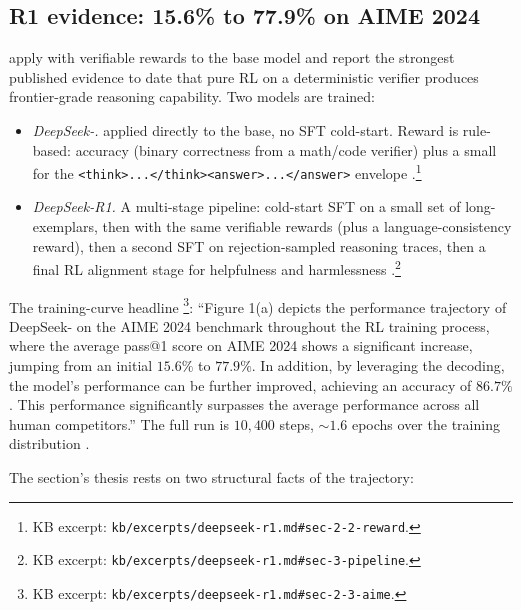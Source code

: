 \subsection{R1 evidence: 15.6\% to 77.9\% on AIME 2024}
\label{sec:rlvr-r1}

\citet{deepseek-r1} apply  with verifiable rewards to the
 base model and report the strongest published evidence to
date that pure RL on a deterministic verifier produces frontier-grade
reasoning capability. Two models are trained:

\begin{itemize}
\item \emph{DeepSeek-.}  applied directly to the base, no SFT
cold-start. Reward is rule-based: accuracy (binary correctness from a
math/code verifier) plus a small  for the
\texttt{<think>...</think><answer>...</answer>} envelope
\citep[\S 2.2]{deepseek-r1}.\footnote{KB excerpt:
\nolinkurl{kb/excerpts/deepseek-r1.md#sec-2-2-reward}.}
\item \emph{DeepSeek-R1.} A multi-stage pipeline: cold-start SFT on a
small set of long- exemplars, then  with the same verifiable
rewards (plus a language-consistency reward), then a second SFT on
rejection-sampled reasoning traces, then a final RL alignment stage for
helpfulness and harmlessness \citep[\S 3]{deepseek-r1}.\footnote{KB
excerpt: \nolinkurl{kb/excerpts/deepseek-r1.md#sec-3-pipeline}.}
\end{itemize}

The training-curve headline \citep[\S 2.3]{deepseek-r1}\footnote{KB
excerpt: \nolinkurl{kb/excerpts/deepseek-r1.md#sec-2-3-aime}.}: ``Figure
1(a) depicts the performance trajectory of DeepSeek- on the AIME
2024 benchmark throughout the RL training process, where the average
pass@1 score on AIME 2024 shows a significant increase, jumping from an
initial $15.6\%$ to $77.9\%$. In addition, by leveraging the
 decoding, the model's performance can be further
improved, achieving an accuracy of $86.7\%$. This performance
significantly surpasses the average performance across all human
competitors.'' The full run is $10{,}400$ steps,
$\sim\!1.6$ epochs over the training distribution
\citep[\S 2.1]{deepseek-r1}.

The section's thesis rests on two structural facts of the
trajectory:


